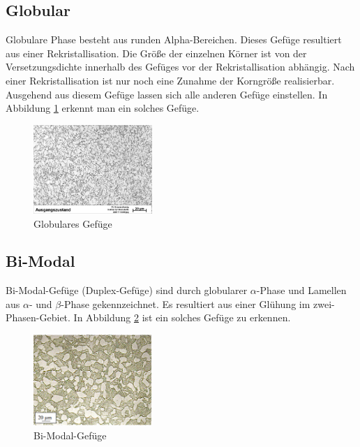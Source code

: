 \documentclass[a4paper, 11pt]{tubsreprt}
\begin{document}
\subsection{Globular}
Globulare Phase besteht aus runden Alpha-Bereichen. Dieses Gefüge resultiert aus einer Rekristallisation. Die Größe der einzelnen Körner ist von der Versetzungsdichte innerhalb des Gefüges vor der Rekristallisation abhängig. Nach einer Rekristallisation ist nur noch eine Zunahme der Korngröße realisierbar. Ausgehend aus diesem Gefüge lassen sich alle anderen Gefüge einstellen. In Abbildung \ref{globular} erkennt man ein solches Gefüge. 
\begin{figure} %
\centering
\includegraphics[width=0.4\textwidth]{Bilder/Ausgangsgefuege.jpg}
\caption{Globulares Gefüge}
\label{globular}
\end{figure}
\subsection{Bi-Modal}
Bi-Modal-Gefüge (Duplex-Gefüge) sind durch globularer $\alpha$-Phase und Lamellen aus $\alpha$- und $\beta$-Phase gekennzeichnet. Es resultiert aus einer Glühung im zwei-Phasen-Gebiet.  In Abbildung \ref{bimodal} ist ein solches Gefüge zu erkennen. 
\begin{figure}
\centering
\includegraphics[width=0.4\textwidth]{Bilder/Duplexgefuege.PNG}
\caption[Bi-Modal-Gefüge]{Bi-Modal-Gefüge\cite{Werkstoffdesign2012}}
\label{bimodal}
\end{figure}
\end{document}
